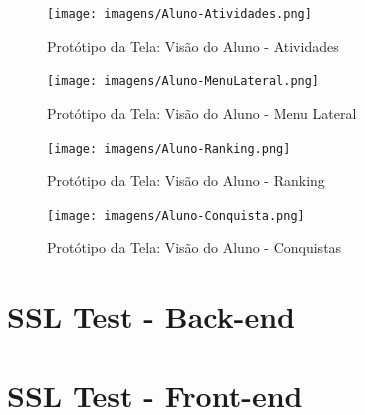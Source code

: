 \begin{apendicesenv}
\begin{figure}[htb]
    \centering
	\texttt{[image: imagens/Aluno-Atividades.png]}
	\caption{\label{fig:aluno} Protótipo da Tela: Visão do Aluno - Atividades}
\end{figure}
\FloatBarrier

\begin{figure}[htb]
    \centering
	\texttt{[image: imagens/Aluno-MenuLateral.png]}
	\caption{\label{fig:menu-lateral} Protótipo da Tela: Visão do Aluno - Menu Lateral}
\end{figure}
\FloatBarrier

\begin{figure}[htb]
    \centering
	\texttt{[image: imagens/Aluno-Ranking.png]}
	\caption{\label{fig:ranking} Protótipo da Tela: Visão do Aluno - Ranking}
\end{figure}
\FloatBarrier

\begin{figure}[htb]
    \centering
	\texttt{[image: imagens/Aluno-Conquista.png]}
	\caption{\label{fig:conquista} Protótipo da Tela: Visão do Aluno - Conquistas}
\end{figure}
\FloatBarrier


\chapter{SSL Test - Back-end}
\label{ssltest-backend}




\chapter{SSL Test - Front-end}
\label{ssltest-frontend}



\end{apendicesenv}

